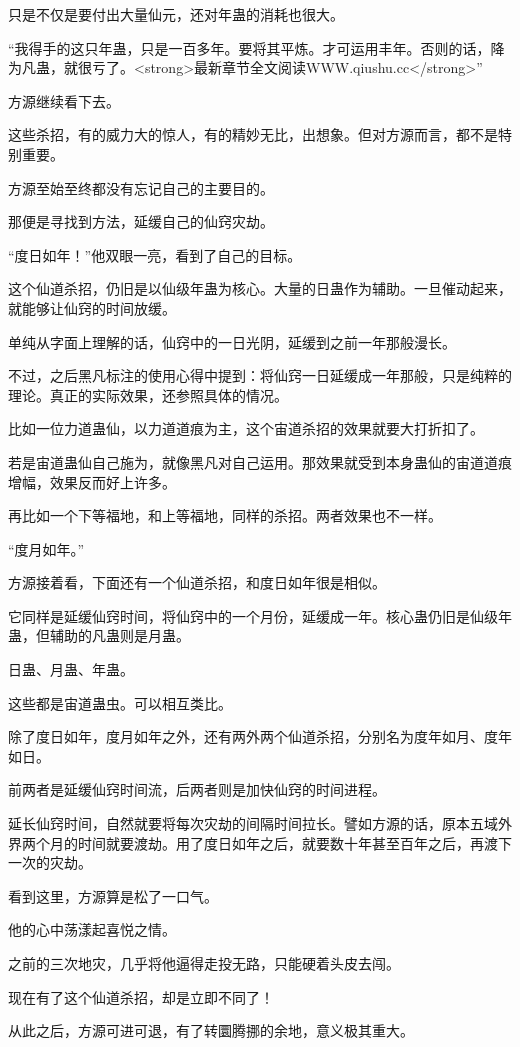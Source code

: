 \begin{this_body}
只是不仅是要付出大量仙元，还对年蛊的消耗也很大。

“我得手的这只年蛊，只是一百多年。要将其平炼。才可运用丰年。否则的话，降为凡蛊，就很亏了。<strong>最新章节全文阅读WWW.qiushu.cc</strong>”

方源继续看下去。

这些杀招，有的威力大的惊人，有的精妙无比，出想象。但对方源而言，都不是特别重要。

方源至始至终都没有忘记自己的主要目的。

那便是寻找到方法，延缓自己的仙窍灾劫。

“度日如年！”他双眼一亮，看到了自己的目标。

这个仙道杀招，仍旧是以仙级年蛊为核心。大量的日蛊作为辅助。一旦催动起来，就能够让仙窍的时间放缓。

单纯从字面上理解的话，仙窍中的一日光阴，延缓到之前一年那般漫长。

不过，之后黑凡标注的使用心得中提到：将仙窍一日延缓成一年那般，只是纯粹的理论。真正的实际效果，还参照具体的情况。

比如一位力道蛊仙，以力道道痕为主，这个宙道杀招的效果就要大打折扣了。

若是宙道蛊仙自己施为，就像黑凡对自己运用。那效果就受到本身蛊仙的宙道道痕增幅，效果反而好上许多。

再比如一个下等福地，和上等福地，同样的杀招。两者效果也不一样。

“度月如年。”

方源接着看，下面还有一个仙道杀招，和度日如年很是相似。

它同样是延缓仙窍时间，将仙窍中的一个月份，延缓成一年。核心蛊仍旧是仙级年蛊，但辅助的凡蛊则是月蛊。

日蛊、月蛊、年蛊。

这些都是宙道蛊虫。可以相互类比。

除了度日如年，度月如年之外，还有两外两个仙道杀招，分别名为度年如月、度年如日。

前两者是延缓仙窍时间流，后两者则是加快仙窍的时间进程。

延长仙窍时间，自然就要将每次灾劫的间隔时间拉长。譬如方源的话，原本五域外界两个月的时间就要渡劫。用了度日如年之后，就要数十年甚至百年之后，再渡下一次的灾劫。

看到这里，方源算是松了一口气。

他的心中荡漾起喜悦之情。

之前的三次地灾，几乎将他逼得走投无路，只能硬着头皮去闯。

现在有了这个仙道杀招，却是立即不同了！

从此之后，方源可进可退，有了转圜腾挪的余地，意义极其重大。


\end{this_body}
